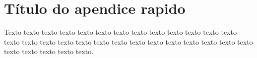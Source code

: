 \chapter{Título do apendice rapido }
\label{cap:ape}

Texto texto texto texto texto texto texto texto texto texto texto texto texto
texto texto texto texto texto texto texto texto texto texto texto texto texto
texto texto texto texto texto texto.
